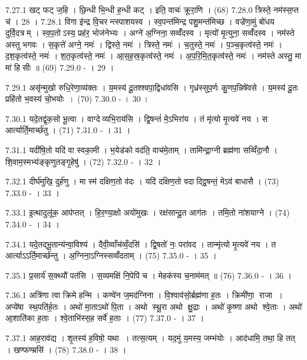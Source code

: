 7.27.1
खट् फट् ज॒हि । छि॒न्धी भि॒न्धी ह॒न्धी कट् । इति॒ वाचः॑ क्रूरा॒णि । (68)
7.28.0
त्रिस्ते॒ नम॑स्स॒प्त च॑ । 28 ।
7.28.1
विगा इ॑न्द्र वि॒चरन्त्स्पाशयस्व । स्व॒पन्त॑मिन्द्र पशु॒मन्त॑मिच्छ । वज्रे॑णा॒मुं बो॑धय दुर्वि॒दत्रम् । स्व॒प॒तोऽस्य॒ प्रह॑र॒ भोज॑नेभ्यः । अग्ने॑ अ॒ग्निना॒ सव्वँ॑दस्व । मृत्यो॑ मृ॒त्युना॒ सव्वँ॑दस्व । नम॑स्ते अस्तु भगवः । स॒कृत्ते॑ अग्ने॒ नमः॑ । द्विस्ते॒ नमः॑ । त्रिस्ते॒ नमः॑ । च॒तुस्ते॒ नमः॑ । प॒ञ्च॒कृत्व॑स्ते॒ नमः॑ । द॒श॒कृत्व॑स्ते॒ नमः॑ । श॒त॒कृत्व॑स्ते॒ नमः॑ । आ॒स॒ह॒स्र॒कृत्व॑स्ते॒ नमः॑ । अ॒प॒रि॒मि॒त॒कृत्व॑स्ते॒ नमः॑ । नम॑स्ते अस्तु॒ मा मा॑ हिसीः ॥ (69)
7.29.0
- । 29 ।
\anuvakamend

7.29.1
असृ॑न्मुखो रुधि॒रेणा॒व्य॑क्तः । य॒मस्य॑ दू॒तश्श्वपा॒द्विधा॑वसि । गृध्र॑स्सुप॒र्णः कु॒णप॒न्निषे॑वसे । य॒मस्य॑ दू॒तः प्रहि॑तो भ॒वस्य॑ चो॒भयोः । (70)
7.30.0
- । 30 ।
\anuvakamend

7.30.1
यदे॒तद्वृ॑क॒सो भू॒त्वा । वाग्देव्यभि॒राय॑सि । द्वि॒षन्तं॑ मे॒ऽभिरा॑य । तं मृ॑त्यो मृ॒त्यवे॑ नय । स आर्त्यार्ति॒मार्च्छ॑तु । (71)
7.31.0
- । 31 ।
\anuvakamend

7.31.1
यदी॑षि॒तो यदि॑ वा स्वका॒मी । भ॒येड॑को वद॑ति॒ वाच॑मे॒ताम् । तामि॑न्द्रा॒ग्नी ब्रह्म॑णा सव्विँदा॒नौ । शि॒वाम॒स्मभ्य॑ङ्कृणुतङ्गृ॒हेषु॑ । (72)
7.32.0
- । 32 ।
\anuvakamend

7.32.1
दीर्घ॑मुखि॒ दुर्\mbox{}ह॑णु । मा स्म॑ दक्षिण॒तो व॑दः । यदि॑ दक्षिण॒तो वदाद्द्वि॒षन्तं॒ मेऽव॑ बाधासै । (73)
7.33.0
- । 33 ।
\anuvakamend

7.33.1
इ॒त्थादुलू॑क॒ आप॑प्तत् । हि॒र॒ण्या॒क्षो अयो॑मुखः । रक्ष॑सान्दू॒त आग॑तः । तमि॒तो ना॑शयाग्ने । (74)
7.34.0
- । 34 ।
\anuvakamend

7.34.1
यदे॒तद्भू॒तान्य॑न्वा॒विश्य॑ । दैवी॒व्वाँच॑व्वँ॒दसि॑ । द्वि॒षतो॑ नः॒ परा॑वद । तान्मृ॑त्यो मृ॒त्यवे॑ नय । त आर्त्याऽऽर्ति॒मार्च्छ॑न्तु । अ॒ग्निना॒ऽग्निस्सव्वँ॑दताम् । (75)
7.35.0
- । 35 ।
\anuvakamend

7.35.1
प्र॒सार्य॑ स॒क्थ्यौ॑ पत॑सि । स॒व्यमक्षि॑ नि॒पेपि॑ च । मेहक॑स्य च॒नाम॑मत् ॥ (76)
7.36.0
- । 36 ।
\anuvakamend

7.36.1
अत्रि॑णा त्वा क्रिमे हन्मि । कण्वे॑न ज॒मद॑ग्निना । वि॒श्वाव॑सो॒र्ब्रह्म॑णा ह॒तः । क्रिमी॑णा॒ राजा । अप्ये॑षा स्थ॒पति॑र्ह॒तः । अथो॑ मा॒ताऽथो॑ पि॒ता । अथो स्थू॒रा अथो क्षु॒द्राः । अथो॑ कृ॒ष्णा अथो श्वे॒ताः । अथो॑ आ॒शाति॑का ह॒ताः । श्वे॒ताभि॑स्स॒ह सर्वे॑ ह॒ताः । (77)
7.37.0
- । 37 ।
\anuvakamend

7.37.1
आह॒राव॑द्य । शृ॒तस्य॑ ह॒विषो॒ यथा । तत्स॒त्यम् । यद॒मुं य॒मस्य॒ जम्भ॑योः । आद॑धामि॒ तथा॒ हि तत् । खण्फण्म्रसि॑ । (78)
7.38.0
- । 38 ।
\anuvakamend


